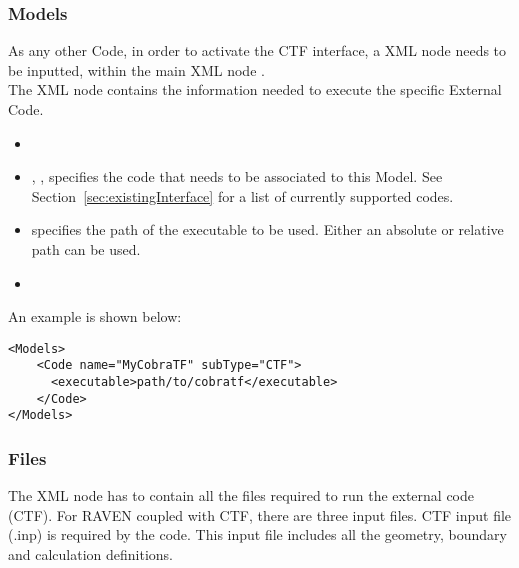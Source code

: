 \subsubsection{Models}
As any other Code, in order to activate the CTF interface, a  XML node needs to be inputted, within the
main XML node .
\\The  {} XML node contains the
information needed to execute the specific External Code.

\attrsIntro
%
\vspace{-5mm}
\begin{itemize}
  \itemsep0em
  \item \nameDescription
  \item {}, , specifies the
  code that needs to be associated to this Model.
  \nb See Section~\ref{sec:existingInterface} for a list of currently supported
  codes.
\end{itemize}
\vspace{-5mm}

\subnodesIntro
%
\begin{itemize}
  \item {}  specifies the path
  of the executable to be used.
  \nb Either an absolute or relative path can be used.
  \item {}
\end{itemize}

An example  is shown  below:

\begin{lstlisting}[style=XML]
<Models>
    <Code name="MyCobraTF" subType="CTF">
      <executable>path/to/cobratf</executable>
    </Code>
</Models>
\end{lstlisting}

\subsubsection{Files}
The  XML node has to contain all the files required to run the external code  (CTF).
For RAVEN coupled with CTF, there are three input files. CTF input file (.inp) is required by the code. This input file includes all the geometry, boundary and calculation definitions.

